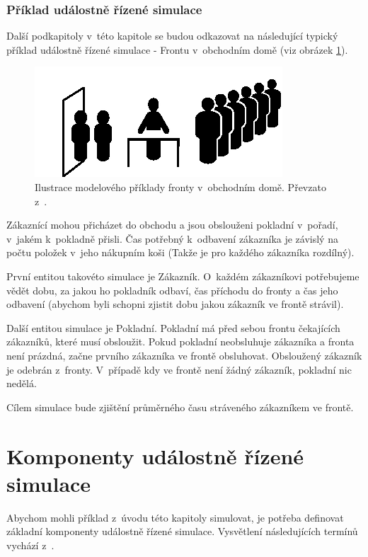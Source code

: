 \subsubsection{Příklad událostně řízené simulace}

Další podkapitoly v~této kapitole se budou odkazovat na následující typický příklad událostně řízené simulace - Frontu v~obchodním domě (viz obrázek \ref{fig:bank}).

\begin{figure}[ht]
\centering
\includegraphics[trim=0cm 0cm 0cm 0cm]{fig/bank}
\caption{Ilustrace modelového příklady fronty v~obchodním domě. Převzato z~\cite{adevs}.}
\label{fig:bank}
\end{figure}

Zákaznící mohou přicházet do obchodu a jsou obslouženi pokladní v~pořadí, v~jakém k~pokladně přisli. Čas potřebný k~odbavení zákazníka je závislý na počtu položek v~jeho nákupním koši (Takže je pro každého zákazníka rozdílný).

První entitou takovéto simulace je Zákazník. O~každém zákazníkovi potřebujeme vědět dobu, za jakou ho pokladník odbaví, čas příchodu do fronty a čas jeho odbavení (abychom byli schopni zjistit dobu jakou zákazník ve frontě strávil).

Další entitou simulace je Pokladní. Pokladní má před sebou frontu čekajících zákazníků, které musí obsloužit. Pokud pokladní neobsluhuje zákazníka a fronta není prázdná, začne prvního zákazníka ve frontě obsluhovat. Obsloužený zákazník je odebrán z~fronty. V~případě kdy ve frontě není žádný zákazník, pokladní nic nedělá.

Cílem simulace bude zjištění průměrného času stráveného zákazníkem ve frontě.

\section{Komponenty událostně řízené simulace}

Abychom mohli příklad z~úvodu této kapitoly simulovat, je potřeba definovat základní komponenty událostně řízené simulace. Vysvětlení následujících termínů vychází z~\cite{dess}.

